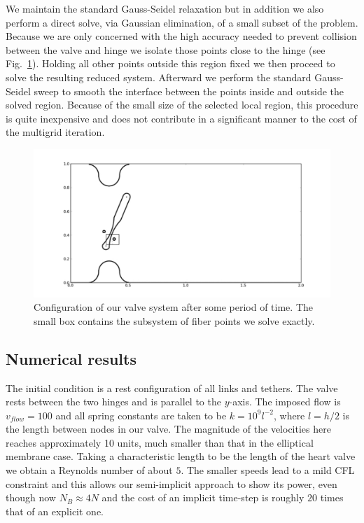 We maintain the standard Gauss-Seidel relaxation but in addition we also perform a direct solve, via Gaussian elimination,  of a small subset of the problem. Because we are only concerned with the high accuracy needed to prevent collision between the valve and hinge we isolate those points close to the hinge (see Fig.~\ref{fig:Box}). Holding all other points outside this region fixed we then proceed to solve the resulting reduced system. Afterward we perform the standard Gauss-Seidel sweep to smooth the interface between the points inside and outside the solved region. Because of the small size of the selected local region, 
 this procedure is quite inexpensive and does not contribute in a significant manner to the cost of the multigrid iteration.

\begin{figure}[!b]
  \begin{center}
    \includegraphics[bb=.5in .25in 7.35in 3.75in,width=5.25in,clip]{Images_Methodology/Box.pdf}
  \end{center}

  \caption{\small Configuration of our valve system after some period of time. The small box contains the subsystem of fiber points we solve exactly.}
  \label{fig:Box}
\end{figure}


\subsection{Numerical results}
The initial condition is a rest configuration of all links and tethers. The valve rests between the two hinges and is parallel to the $y$-axis. The imposed flow is $v_{flow}=100$ and all spring constants are taken to be $k=10^9l^{-2}$, where $l=h/2$ is the length between nodes in our valve. The magnitude of the velocities here reaches approximately 10 units,  much smaller than that in the elliptical membrane case. Taking a characteristic length to be the length of the heart valve we obtain a Reynolds number of about $5$. The smaller speeds lead to a mild CFL constraint and this allows our  semi-implicit approach to show its power, even though now $N_B \approx 4N$ and the cost of an implicit time-step is roughly $20$ times that of an explicit one.

